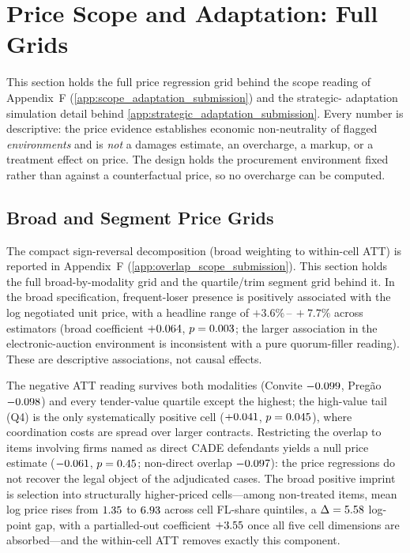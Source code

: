 \section{Price Scope and Adaptation: Full Grids}
\label{supp:price}

This section holds the full price regression grid behind the scope reading
of Appendix~F (\ref{app:scope_adaptation_submission}) and the strategic-%
adaptation simulation detail behind \ref{app:strategic_adaptation_submission}.
Every number is descriptive: the price evidence establishes economic
non-neutrality of flagged \emph{environments} and is \emph{not} a damages
estimate, an overcharge, a markup, or a treatment effect on price. The
design holds the procurement environment fixed rather than against a
counterfactual price, so no overcharge can be computed.

\subsection{Broad and Segment Price Grids}
\label{supp:price_grids}

The compact sign-reversal decomposition (broad weighting to within-cell
ATT) is reported in Appendix~F (\ref{app:overlap_scope_submission}). This
section holds the full broad-by-modality grid and the quartile/trim segment
grid behind it. In the broad specification, frequent-loser presence is
positively associated with the log negotiated unit price, with a headline
range of $+3.6\%\,\text{--}\,+7.7\%$ across estimators (broad coefficient
$+0.064$, $p=0.003$; the larger association in the
electronic-auction environment is inconsistent with a pure quorum-filler
reading). These are descriptive associations, not causal effects.

The negative ATT reading survives both modalities (Convite
$-0.099$, Preg\~ao $-0.098$) and every
tender-value quartile except the highest; the high-value tail (Q4) is the
only systematically positive cell ($+0.041$, $p=0.045$),
where coordination costs are spread over larger contracts. Restricting the
overlap to items involving firms named as direct CADE defendants yields a
null price estimate ($-0.061$, $p=0.45$;
non-direct overlap $-0.097$): the price regressions
do not recover the legal object of the adjudicated cases. The broad
positive imprint is selection into structurally higher-priced cells---among
non-treated items, mean log price rises from $1.35$ to
$6.93$ across cell FL-share quintiles, a $\Delta=5.58$
log-point gap, with a partialled-out coefficient $+3.55$
once all five cell dimensions are absorbed---and the within-cell ATT removes
exactly this component.

